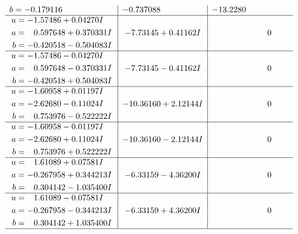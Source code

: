 \documentclass[1p]{elsarticle_modified}
\theoremstyle{definition}
\begin{document}
$$\begin{array}{c|c|c}
\begin{aligned}
b &= -0.179116\phantom{ +0.000000I}\end{aligned}
 & -0.737088\phantom{ +0.000000I} & -13.2280\phantom{ +0.000000I} \\ \hline\begin{aligned}
u &= -1.57486 + 0.04270 I \\
a &= \phantom{-}0.597648 + 0.370331 I \\
b &= -0.420518 - 0.504083 I\end{aligned}
 & -7.73145 + 0.41162 I & \phantom{-0.000000 } 0 \\ \hline\begin{aligned}
u &= -1.57486 - 0.04270 I \\
a &= \phantom{-}0.597648 - 0.370331 I \\
b &= -0.420518 + 0.504083 I\end{aligned}
 & -7.73145 - 0.41162 I & \phantom{-0.000000 } 0 \\ \hline\begin{aligned}
u &= -1.60958 + 0.01197 I \\
a &= -2.62680 - 0.11024 I \\
b &= \phantom{-}0.753976 - 0.522222 I\end{aligned}
 & -10.36160 + 2.12144 I & \phantom{-0.000000 } 0 \\ \hline\begin{aligned}
u &= -1.60958 - 0.01197 I \\
a &= -2.62680 + 0.11024 I \\
b &= \phantom{-}0.753976 + 0.522222 I\end{aligned}
 & -10.36160 - 2.12144 I & \phantom{-0.000000 } 0 \\ \hline\begin{aligned}
u &= \phantom{-}1.61089 + 0.07581 I \\
a &= -0.267958 + 0.344213 I \\
b &= \phantom{-}0.304142 - 1.035400 I\end{aligned}
 & -6.33159 - 4.36200 I & \phantom{-0.000000 } 0 \\ \hline\begin{aligned}
u &= \phantom{-}1.61089 - 0.07581 I \\
a &= -0.267958 - 0.344213 I \\
b &= \phantom{-}0.304142 + 1.035400 I\end{aligned}
 & -6.33159 + 4.36200 I & \phantom{-0.000000 } 0\\
 \hline 
 \end{array}$$\newpage$$\begin{array}{c|c|c}  

\end{array}$$
\end{document}
